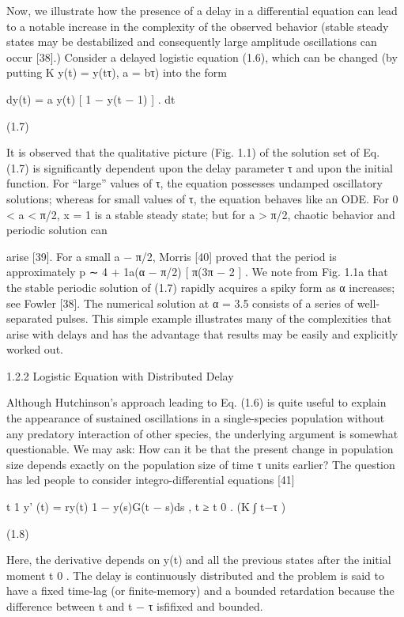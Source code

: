 \documentclass[12pt]{article}
\begin{document}
Now, we illustrate how the presence of a delay in a differential equation can lead to a notable increase in the complexity of the observed 
behavior (stable steady states may be destabilized and consequently large amplitude oscillations can occur [38].) Consider a delayed logistic 
equation (1.6), which can be changed (by putting K y(t) = y(tτ), a  = bτ) into the form

dy(t) = a  y(t) [ 1 − y(t − 1) ] . dt

(1.7)

It is observed that the qualitative picture (Fig. 1.1) of the solution set of Eq. (1.7) is significantly dependent upon the delay parameter τ 
and upon the initial function. For “large” values of τ, the equation possesses undamped oscillatory solutions; whereas for small values of τ, 
the equation behaves like an ODE. For 0 < a  < π/2, x = 1 is a stable steady state; but for a  > π/2, chaotic behavior and periodic solution 
can

arise [39]. For a small a  − π/2, Morris [40] proved that the period is approximately p ∼ 4 + 1a(α  − π/2) [ π(3π − 2 ] . We note from 
Fig. 1.1a that the stable periodic solution of (1.7) rapidly acquires a spiky form as α  increases; see Fowler [38]. The numerical solution 
at α  = 3.5 consists of a series of well-separated pulses. This simple example illustrates many of the complexities that arise with delays 
and has the advantage that results may be easily and explicitly worked out.

1.2.2 Logistic Equation with Distributed Delay

Although Hutchinson’s approach leading to Eq. (1.6) is quite useful to explain the appearance of sustained oscillations in a single-species 
population without any predatory interaction of other species, the underlying argument is somewhat questionable. We may ask: How can it be 
that the present change in population size depends exactly on the population size of time τ units earlier? The question has led people to 
consider integro-differential equations [41]

t 1 y' (t) = ry(t) 1 − y(s)G(t − s)ds , t ≥ t 0 . (K ∫ t−τ )

(1.8)

Here, the derivative depends on y(t) and all the previous states after the initial moment t 0 . The delay is continuously distributed and the 
problem is said to have a fixed time-lag (or finite-memory) and a bounded retardation because the difference between t and t − τ isfiﬁxed 
and bounded.
\end{document}
